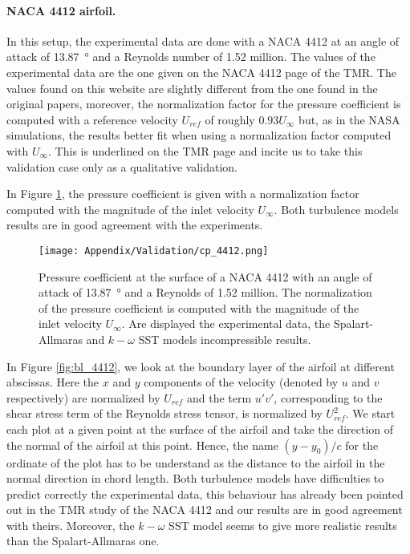 \begin{subappendices}
	\paragraph{NACA 4412 airfoil.} In this setup, the experimental data \cite{NACA4412} are done with a NACA 4412 at an angle of attack of \SI{13.87}{\degree} and a Reynolds number of 1.52 million. The values of the experimental data are the one given on the NACA 4412 page of the TMR. The values found on this website are slightly different from the one found in the original papers, moreover, the normalization factor for the pressure coefficient is computed with a reference velocity $U_{ref}$ of roughly $0.93U_\infty$ but, as in the NASA simulations, the results better fit when using a normalization factor computed with $U_\infty$. This is underlined on the TMR page and incite us to take this validation case only as a qualitative validation.
	
	In Figure \ref{fig:cp_4412}, the pressure coefficient is given with a normalization factor computed with the magnitude of the inlet velocity $U_\infty$. Both turbulence models results are in good agreement with the experiments. 
	\begin{figure}
		\centering
		\texttt{[image: Appendix/Validation/cp\_4412.png]}
		\caption{Pressure coefficient at the surface of a NACA 4412 with an angle of attack of \SI{13.87}{\degree} and a Reynolds of 1.52 million. The normalization of the pressure coefficient is computed with the magnitude of the inlet velocity $U_\infty$. Are displayed the experimental data, the Spalart-Allmaras and $k-\omega$ SST models incompressible results.}
		\label{fig:cp_4412}
	\end{figure}
	
	In Figure \ref{fig:bl_4412}, we look at the boundary layer of the airfoil at different abscissas. Here the $x$ and $y$ components of the velocity (denoted by $u$ and $v$ respectively) are normalized by $U_{ref}$ and the term $u'v'$, corresponding to the shear stress term of the Reynolds stress tensor, is normalized by $U_{ref}^2$. We start each plot at a given point at the surface of the airfoil and take the direction of the normal of the airfoil at this point. Hence, the name $(y - y_0)/c$ for the ordinate of the plot has to be understand as the distance to the airfoil in the normal direction in chord length. Both turbulence models have difficulties to predict correctly the experimental data, this behaviour has already been pointed out in the TMR study of the NACA 4412 and our results are in good agreement with theirs. Moreover, the $k-\omega$ SST model seems to give more realistic results than the Spalart-Allmaras one.
	

\end{subappendices}
